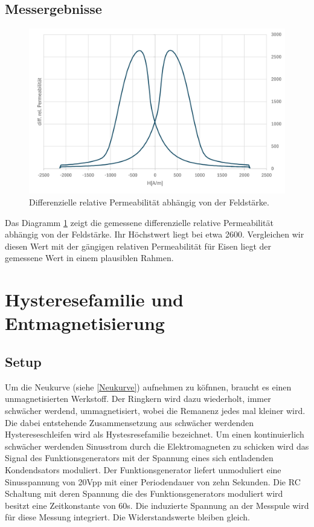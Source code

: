 \documentclass[a4paper,twoside,12pt,DIV=13,BCOR=5mm,numbers=noenddot,cleardoublepage=empty]{scrbook}
\begin{document}
\subsection{Messergebnisse}
\begin{figure}
  \includegraphics[width=\linewidth]{pictures/Permeabilitaet.png}
  \caption{Differenzielle relative Permeabilit\"at abh\"angig von der Feldst\"arke.}
  \label{fig:perm}
\end{figure}
Das Diagramm \ref{fig:perm} zeigt die gemessene differenzielle relative Permeabilit\"at abh\"angig von der Feldst\"arke. Ihr H\"ochstwert liegt bei etwa  2600. 
Vergleichen wir diesen Wert mit der g\"angigen relativen Permeabilit\"at f\"ur Eisen liegt der gemessene Wert in einem plausiblen Rahmen.

\section{Hysteresefamilie und Entmagnetisierung}
\label{Entmag}
\subsection{Setup}
Um die Neukurve (siehe \ref{Neukurve}) aufnehmen zu k\"ofnnen, braucht es einen unmagnetisierten Werkstoff. 
Der Ringkern wird dazu wiederholt, immer schw\"acher werdend, ummagnetisiert, wobei die Remanenz jedes mal kleiner wird.
Die dabei entstehende Zusammensetzung aus schw\"acher werdenden Hystereseschleifen wird als Hystesresefamilie bezeichnet. 
Um einen kontinuierlich schw\"acher werdenden Sinusstrom durch die Elektromagneten zu schicken wird das Signal des Funktionsgenerators 
mit der Spannung eines sich entladenden Kondendsators moduliert. Der Funktionsgenerator liefert unmoduliert eine Sinusspannung von 20Vpp  mit einer Periodendauer von zehn Sekunden.
Die RC Schaltung mit deren Spannung die des Funktionsgenerators moduliert wird besitzt eine Zeitkonstante von 60s. Die induzierte Spannung an der Messpule wird f\"ur diese Messung integriert. 
Die Widerstandswerte bleiben gleich.
\end{document}
